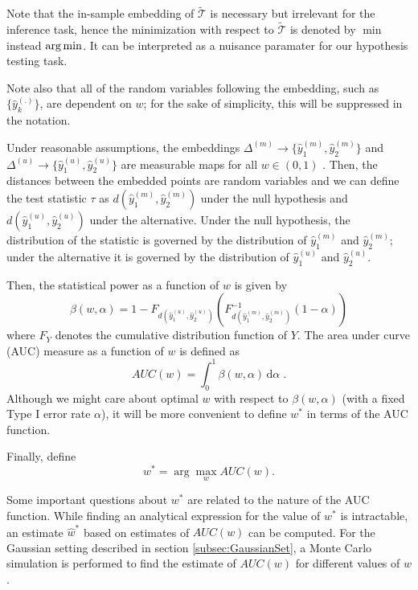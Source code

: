 \documentclass[12pt,oneside,final]{thesis}
\begin{document}
\begin{remark}
 Note that the in-sample embedding of $\widetilde{\mathcal{T}}$ is necessary but irrelevant for the inference task, hence the minimization with respect to $\widetilde{\mathcal{T}}$ is denoted by  $\min$ instead $\arg\min$. It can be interpreted as a nuisance paramater for our hypothesis testing task.
\end{remark}
\begin{remark}
 Note also that  all of the random variables following the embedding, such as $\{\hat{y}_{k}^{(.)}\}\!$,  are dependent on $w$; for the sake of simplicity, this will  be suppressed in the notation. 
\end{remark}

 Under reasonable assumptions, the embeddings $\Delta^{(m)} \rightarrow  \{\hat{y}_{1}^{(m)},\hat{y}_{2}^{(m)}\!\}$  and $\Delta^{(u)}\rightarrow \{\hat{y}_{1}^{(u)} , \hat{y}_{2}^{(u)}\}$ are measurable maps for all $w \in (0,1)$ \cite{measurable_Niemiro1992}. Then, the distances between the embedded points are random variables and we can define the test statistic $\tau$ as $d(\hat{y}_{1}^{(m)},\hat{y}_{2}^{(m)})$ under the null hypothesis  and $d(\hat{y}_{1}^{(u)},\hat{y}_{2}^{(u)})$ under the alternative. Under the null hypothesis, the distribution of the statistic is governed by the distribution of $\hat{y}_{1}^{(m)}$ and $\hat{y}_{2}^{(m)}$; under the alternative it is governed by  the distribution of $\hat{y}_{1}^{(u)}$ and $\hat{y}_{2}^{(u)}$.

 Then, the statistical power as a function of $w$ is given by  \[\beta\left( w,\alpha\right)=1-F_{d \left(\hat{y}_{1}^{(u)},\hat{y}_{2}^{(u)}\right)} \left(F_{d\left(\hat{y}_{1}^{(m)},\hat{y}_{2}^{(m)}\right)}^{-1}(1-\alpha) \right)\] where $F_Y$ denotes  the   cumulative distribution function of  $Y$. The area under curve (AUC) measure  as a function of $w$ is defined as  
\begin{equation} 
AUC(w)=\int_{0}^{1}\! \beta\left( w,\alpha\right)\,\mathrm{d}\alpha \; . \label{AUC_def}
\end{equation} 
Although we might care about optimal $w$ with respect to  $\beta\left( w,\alpha\right)$ (with a fixed Type I error rate $\alpha$),  it will be more convenient to define $w^*$ in terms of the AUC function.

 Finally, define $$w^{*}=\arg\max_w{AUC\left( w\right)}. $$

 Some important questions about $w^*$ are  related to the nature of the AUC function.
While finding an analytical expression for the value of $w^*$ is intractable, an estimate $\hat{w}^*$  based on  estimates of $AUC(w)$ %
 can be computed.  For the Gaussian setting described in  section \ref{subsec:GaussianSet}, a Monte Carlo simulation is performed  to find the estimate of $AUC(w)$ for different values of $w$.
\end{document}

